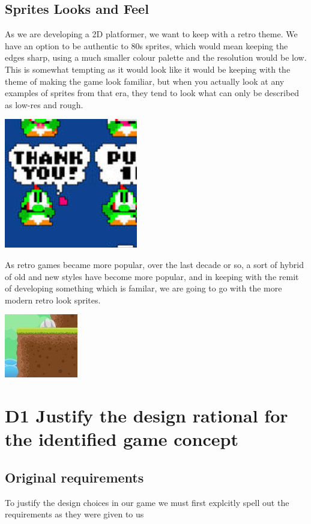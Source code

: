 \documentclass{article}
\begin{document}
\subsection{ Sprites Looks and Feel }
As we are developing a 2D platformer, we want to keep with a retro theme. We have an option to be authentic to 80s sprites, which would mean keeping the edges sharp, using a much smaller colour palette and the resolution would be low.
This is somewhat tempting as it would look like it would be keeping with the theme of making the game look familiar, but when you actually look at any examples of sprites from that era, they tend to look what can only be described as low-res and rough.

\includegraphics[scale=0.5]{TraditionalSprite}

As retro games became more popular, over the last decade or so, a sort of hybrid of old and new styles have become more popular, and in keeping with the remit of developing something which is familar, we are going to go with the more modern retro look sprites.

\includegraphics[scale=0.5]{SoftSprite}


\section{D1 Justify the design rational for the identified game concept}


\subsection{Original requirements}
To justify the design choices in our game we must first explcitly spell out the requirements as they were given to us
\end{document}
